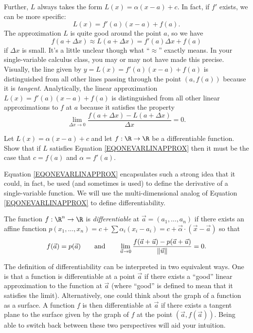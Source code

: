 Further, $L$ always takes the form $L(x)=\alpha(x-a)+c$.  In fact, if $f'$ exists,
we can be more
specific:  \[L(x)=f'(a)(x-a)+f(a).\]
The approximation $L$ is quite good around the point $a$, so we have
\[
	f(a+\Delta x)\approx L(a+\Delta x) = f'(a)\Delta x+f(a)
\]
if $\Delta x$ is small.  It's a little unclear though what ``$\approx$''
exactly means.  In your single-variable calculus class, you may or may not
have made this precise.  Visually, the line given by $y=L(x)=f'(a)(x-a)+f(a)$
is distinguished from all other lines passing through the point $(a,f(a))$ because
it is \emph{tangent}.  Analytically, the linear approximation $L(x)=f'(a)(x-a)+f(a)$
is distinguished from all other linear approximations to $f$ at $a$ because it satisfies
the property
\begin{equation}
	\label{EQONEVARLINAPPROX}
	\lim_{\Delta x\to 0} \frac{f(a+\Delta x)-L(a+\Delta x)}{\Delta x} = 0.
\end{equation}

\begin{exercise}
	Let $L(x)=\alpha(x-a)+c$ and let $f:\R\to\R$ be a differentiable function.
	Show that if $L$ satisfies Equation \eqref{EQONEVARLINAPPROX} then it
	must be the case that $c=f(a)$ and $\alpha=f'(a)$.
\end{exercise}

Equation \eqref{EQONEVARLINAPPROX} encapsulates such a strong idea that
it could, in fact, be used (and sometimes is used) to define the derivative
of a single-variable function.  We will use the multi-dimensional
analog of Equation \eqref{EQONEVARLINAPPROX} to define differentiability.

\begin{definition}[Differentiable]
	The function $f:\R^n\to \R$ is 
	\emph{differentiable}
	at $\vec a=(a_1,\ldots,a_n)$ if there exists
	an affine function $p(x_1,\ldots, x_n)
	= c+\sum \alpha_i (x_i-a_i) = c+\vec \alpha \cdot(\vec x-\vec a)$ so that
	\[
		f(\vec a)=p(\vec a)\qquad\text{and}\qquad\lim_{\vec u\to0} \frac{f(\vec a + \vec u)-p(\vec a + \vec u)}{\lVert\vec u\rVert} = 0.
	\]
\end{definition}

The definition of differentiability can be interpreted in two equivalent
ways.  One is that a function is differentiable at a point $\vec a$ if there exists a ``good''
linear approximation to the function at $\vec a$ (where ``good'' is defined
to mean that it satisfies the limit).  Alternatively, one could think
about the graph of a function as a surface.  A function $f$ is then differentiable
at $\vec a$ if there exists a tangent plane to the surface given by the graph
of $f$ at the point $(\vec a, f(\vec a))$.  Being able to switch back between these
two perspectives will aid your intuition.

